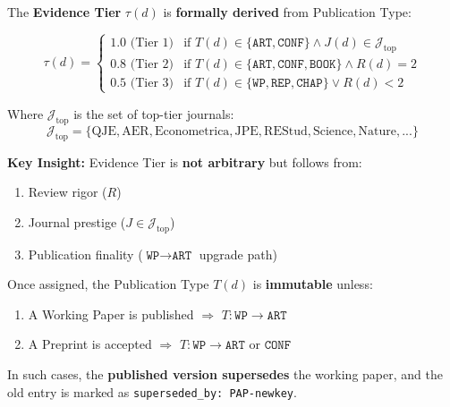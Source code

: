 \begin{tcolorbox}[colback=blue!5!white, colframe=blue!75!black,
    title=\textbf{Definition 0b: Evidence Tier Derivation from Publication Type}]

The \textbf{Evidence Tier} $\tau(d)$ is \textbf{formally derived} from Publication Type:

\begin{equation}
\tau(d) = \begin{cases}
1.0 \text{ (Tier 1)} & \text{if } T(d) \in \{\texttt{ART}, \texttt{CONF}\} \land J(d) \in \mathcal{J}_{\text{top}} \\
0.8 \text{ (Tier 2)} & \text{if } T(d) \in \{\texttt{ART}, \texttt{CONF}, \texttt{BOOK}\} \land R(d) = 2 \\
0.5 \text{ (Tier 3)} & \text{if } T(d) \in \{\texttt{WP}, \texttt{REP}, \texttt{CHAP}\} \lor R(d) < 2
\end{cases}
\end{equation}

Where $\mathcal{J}_{\text{top}}$ is the set of top-tier journals:
\begin{equation}
\mathcal{J}_{\text{top}} = \{\text{QJE}, \text{AER}, \text{Econometrica}, \text{JPE}, \text{REStud}, \text{Science}, \text{Nature}, ...\}
\end{equation}

\textbf{Key Insight:} Evidence Tier is \textbf{not arbitrary} but follows from:
\begin{enumerate}[nosep]
    \item Review rigor ($R$)
    \item Journal prestige ($J \in \mathcal{J}_{\text{top}}$)
    \item Publication finality ($\texttt{WP} \to \texttt{ART}$ upgrade path)
\end{enumerate}

\end{tcolorbox}

\begin{tcolorbox}[colback=green!5!white, colframe=green!75!black,
    title=\textbf{Axiom PUB-1: Publication Type Immutability}]

Once assigned, the Publication Type $T(d)$ is \textbf{immutable} unless:
\begin{enumerate}[nosep]
    \item A Working Paper is published $\Rightarrow$ $T: \texttt{WP} \to \texttt{ART}$
    \item A Preprint is accepted $\Rightarrow$ $T: \texttt{WP} \to \texttt{ART}$ or $\texttt{CONF}$
\end{enumerate}

In such cases, the \textbf{published version supersedes} the working paper,
and the old entry is marked as \texttt{superseded\_by: PAP-newkey}.

\end{tcolorbox}

